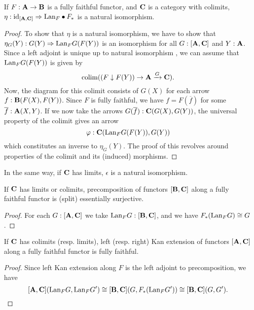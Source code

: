 \begin{lemma}\label{lem:lan-precomp-iso}
  If $ F : \mathbf{A} \to \mathbf{B} $ is a fully faithful functor, and $ \mathbf{C} $ is a category with colimits, $ \eta: \text{id}_{[\mathbf{A}, \mathbf{C}]} \Rightarrow \text{Lan}_{F} \bullet F_* $ is a natural isomorphism.
\end{lemma}
\begin{proof}
  To show that $ \eta $ is a natural isomorphism, we have to show that $ \eta_G(Y): G(Y) \Rightarrow \text{Lan}_{F}G(F(Y)) $ is an isomorphism for all $ G: [\mathbf{A}, \mathbf{C}] $ and $ Y: \mathbf{A} $. Since a left adjoint is unique up to natural isomorphism \autocite[][Exercise 153]{CT4P}, we can assume that $ \text{Lan}_{F}G(F(Y)) $ is given by
  \[ \text{colim} ((F \downarrow F(Y)) \to \mathbf{A} \xrightarrow G \mathbf{C}). \]
  Now, the diagram for this colimit consists of $ G(X) $ for each arrow $ f: \mathbf{B}(F(X), F(Y)) $. Since $ F $ is fully faithful, we have $ f = F(\overline f) $ for some $ \overline f: \mathbf{A}(X, Y) $. If we now take the arrows $ G(\overline f): \mathbf{C}(G(X), G(Y)) $, the universal property of the colimit gives an arrow
  \[ \varphi: \mathbf{C}(\text{Lan}_{F}G(F(Y)), G(Y)) \]
  which constitutes an inverse to $ \eta_G(Y) $. The proof of this revolves around properties of the colimit and its (induced) morphisms.
\end{proof}

\begin{remark}
  In the same way, if $ \mathbf{C} $ has limits, $ \epsilon $ is a natural isomorphism.
\end{remark}

\begin{corollary}\label{cor:surjective-precomposition}
  If $ \mathbf{C} $ has limits or colimits, precomposition of functors $ [\mathbf{B}, \mathbf{C}] $ along a fully faithful functor is (split) essentially surjective.
\end{corollary}
\begin{proof}
  For each $ G: [\mathbf{A}, \mathbf{C}] $ we take $ \text{Lan}_{F}G: [\mathbf{B}, \mathbf{C}] $, and we have $ F_*(\text{Lan}_{F}G) \cong G $.
\end{proof}

\begin{corollary}
  If $ \mathbf{C} $ has colimits (resp. limits), left (resp. right) Kan extension of functors $ [\mathbf{A}, \mathbf{C}] $ along a fully faithful functor is fully faithful.
\end{corollary}
\begin{proof}
  Since left Kan extension along $ F $ is the left adjoint to precomposition, we have
  \[ [\mathbf{A}, \mathbf{C}](\text{Lan}_{F}G, \text{Lan}_{F}G^\prime) \cong [\mathbf{B}, \mathbf{C}](G, F_*(\text{Lan}_{F}G^\prime)) \cong [\mathbf{B}, \mathbf{C}](G, G^\prime). \]
\end{proof}

